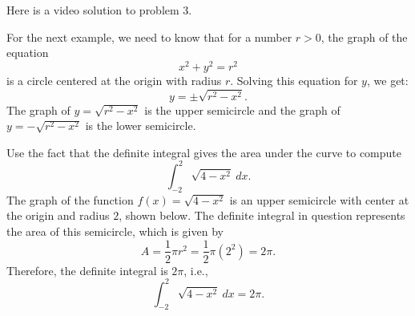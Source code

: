 \documentclass[handout]{ximera}
\begin{document}
Here is a video solution to problem 3.
\begin{foldable}
\end{foldable}

For the next example, we need to know that for a number $r>0$,
the graph of the equation
\[x^2 + y^2 = r^2\]
is a circle centered at the origin with radius $r$.
Solving this equation for $y$, we get:
\[y = \pm \sqrt{r^2 - x^2}.\]
The graph of $y = \sqrt{r^2 -x^2}$ is the upper semicircle and the
graph of $y = -\sqrt{r^2 -x^2}$ is the lower semicircle.

\begin{example}[example 4]
Use the fact that the definite integral gives the area under the curve to compute
\[\int_{-2}^2 \sqrt{4-x^2} \ dx.\]
The graph of the function $f(x) = \sqrt{4-x^2}$ is an upper semicircle with center at the origin and radius $2$, shown below. 
The definite integral in question represents the area of this semicircle, which is given by
\[
A = \frac12 \pi r^2 = \frac12 \pi (2^2) = 2\pi.
\]
Therefore, the definite integral is $2\pi$, i.e.,
\[\int_{-2}^2 \sqrt{4-x^2} \ dx =2\pi.\]







\end{example}
\end{document}
